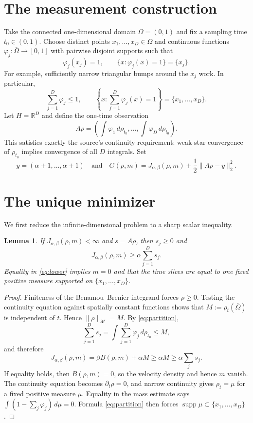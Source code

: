 \documentclass[11pt]{article}
\newtheorem{lemma}{Lemma}
\newcommand{\R}{\mathbb R}
\newcommand{\M}{\mathcal M}
\newcommand{\supp}{\operatorname{supp}}
\begin{document}
\section{The measurement construction}

Take the connected one-dimensional domain $\Omega=(0,1)$ and fix a sampling
time $t_0\in(0,1)$.  Choose distinct points $x_1,\ldots,x_D\in\Omega$ and
continuous functions $\varphi_j:\overline\Omega\to[0,1]$ with pairwise
disjoint supports such that
\[
 \varphi_j(x_j)=1,
 \qquad \{x:\varphi_j(x)=1\}=\{x_j\}.
\]
For example, sufficiently narrow triangular bumps around the $x_j$ work.
In particular,
\begin{equation}\label{eq:partition}
 \sum_{j=1}^D\varphi_j\le1,
 \qquad
 \left\{x:\sum_{j=1}^D\varphi_j(x)=1\right\}
 =\{x_1,\ldots,x_D\}.
\end{equation}
Let $H=\R^D$ and define the one-time observation
\begin{equation}\label{eq:A}
 A\rho
 =\left(\int\varphi_1\,d\rho_{t_0},\ldots,
         \int\varphi_D\,d\rho_{t_0}\right).
\end{equation}
This satisfies exactly the source's continuity requirement: weak-star
convergence of $\rho_{t_0}$ implies convergence of all $D$ integrals.  Set
\[
 y=(\alpha+1,\ldots,\alpha+1)
 \quad\text{and}\quad
 G(\rho,m)=J_{\alpha,\beta}(\rho,m)
       +\frac12\|A\rho-y\|_2^2.
\]

\section{The unique minimizer}

We first reduce the infinite-dimensional problem to a sharp scalar inequality.

\begin{lemma}\label{lem:mass}
If $J_{\alpha,\beta}(\rho,m)<\infty$ and $s=A\rho$, then $s_j\ge0$ and
\begin{equation}\label{eq:lower}
 J_{\alpha,\beta}(\rho,m)\ge \alpha\sum_{j=1}^D s_j.
\end{equation}
Equality in \eqref{eq:lower} implies $m=0$ and that the time slices are equal
to one fixed positive measure supported on $\{x_1,\ldots,x_D\}$.
\end{lemma}

\begin{proof}
Finiteness of the Benamou--Brenier integrand forces $\rho\ge0$.  Testing the
continuity equation against spatially constant functions shows that
$M:=\rho_t(\overline\Omega)$ is independent of $t$.  Hence
$\|\rho\|_{\M}=M$.  By \eqref{eq:partition},
\[
 \sum_{j=1}^D s_j
 =\int\sum_{j=1}^D\varphi_j\,d\rho_{t_0}
 \le M,
\]
and therefore
\[
 J_{\alpha,\beta}(\rho,m)=\beta B(\rho,m)+\alpha M
 \ge\alpha M\ge\alpha\sum_j s_j.
\]
If equality holds, then $B(\rho,m)=0$, so the velocity density and hence $m$
vanish.  The continuity equation becomes $\partial_t\rho=0$, and narrow
continuity gives $\rho_t=\mu$ for a fixed positive measure $\mu$.  Equality in
the mass estimate says
$\int(1-\sum_j\varphi_j)\,d\mu=0$.  Formula \eqref{eq:partition} then forces
$\supp\mu\subset\{x_1,\ldots,x_D\}$.
\end{proof}
\end{document}
